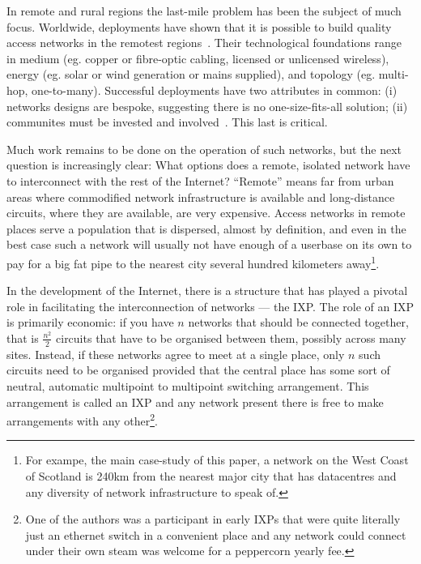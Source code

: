 In remote and rural regions the last-mile problem has been the subject of much
focus. Worldwide, deployments have shown that it is possible to build quality
access networks in the remotest regions~\cite{xxx}. Their technological
foundations range in medium (eg. copper or fibre-optic cabling, licensed
or unlicensed wireless), energy (eg. solar or wind generation or
mains supplied), and topology (eg. multi-hop,
one-to-many). Successful deployments
have two attributes in common: (i) networks designs are bespoke, suggesting
there is no one-size-fits-all solution; (ii) communites must be
invested and involved~\cite{Wallace:2015a, Wallace2015b}. This last is critical.

Much work remains to be done on the operation of such networks, but
the next question is increasingly clear: What options does a remote,
isolated network have to interconnect with the rest of the Internet?
``Remote'' means far from urban areas where commodified network
infrastructure is available and long-distance circuits, where they are
available, are very expensive. Access networks in remote places serve
a population that is dispersed, almost by definition, and even in the
best case such a network will usually not have enough of a userbase on
its own to pay for a big fat pipe to the nearest city several hundred
kilometers away\footnote{For exampe, the main case-study of this
paper, a network on the West Coast of Scotland is 240km from the
nearest major city that has datacentres and any diversity of network
infrastructure to speak of.}.


In the development of the Internet, there is a structure that has
played a pivotal role in facilitating the interconnection of networks
--- the \acf{IXP}. The role of an \ac{IXP} is primarily economic: if
you have $n$ networks that should be connected together, that is
$\frac{n^2}{2}$ circuits that have to be organised between them,
possibly across many sites. Instead, if these networks agree to meet
at a single place, only $n$ such circuits need to be organised
provided that the central place has some sort of neutral, automatic
multipoint to multipoint switching arrangement. This arrangement is
called an \ac{IXP} and any network present there is free to make
arrangements with any other\footnote{One of the authors was a
participant in early \acp{IXP} that were quite literally just an
ethernet switch in a convenient place and any network could connect
under their own steam was welcome for a peppercorn yearly fee.}.

